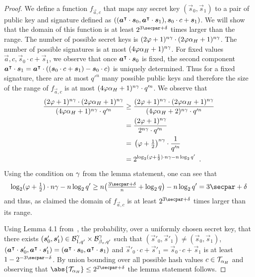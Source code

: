 \begin{proof}
  We define a function $f_{\vec{a}, c}$ that maps any secret key $(\vec{s}_0, \vec{s}_1)$ to a pair of public key and signature defined as $((\boldsymbol{a}^\intercal\cdot\boldsymbol{s}_0,\boldsymbol{a}^\intercal\cdot\boldsymbol{s}_1), \boldsymbol{s}_0\cdot c + \boldsymbol{s}_1)$.
  We will show that the domain of this function is at least $2^{3\secpar + \delta}$ times larger than the range.
  The number of possible secret keys is $(2\varphi+1)^{n\gamma} \cdot (2\varphi\alpha_H+1)^{n\gamma}$.
  The number of possible signatures is at most $(4\varphi\alpha_H + 1)^{n\gamma}$.
  For fixed values $\vec{a}, c, \vec{s}_0\cdot c + \vec{s}_1$, we observe that once $\boldsymbol{a}^\intercal\cdot\boldsymbol{s}_0$ is fixed, the second component $\boldsymbol{a}^\intercal\cdot\boldsymbol{s}_1 = \boldsymbol{a}^\intercal \cdot ((\boldsymbol{s}_0\cdot c + \boldsymbol{s}_1) - \boldsymbol{s}_0 \cdot c)$ is uniquely determined.
  Thus for a fixed signature, there are at most $q'^n$ many possible public keys and therefore the size of the range of $f_{\vec{a}, c}$ is at most $(4 \varphi\alpha_H + 1)^{n\gamma} \cdot q'^n$.
  We observe that
  \begin{align*}\frac{(2\varphi+1)^{n\gamma} \cdot (2\varphi\alpha_H+1)^{n\gamma}}{(4 \varphi\alpha_H + 1)^{n\gamma} \cdot q'^n}
   \geq{}& \frac{(2\varphi+1)^{n\gamma} \cdot (2\varphi\alpha_H+1)^{n\gamma}}{(4 \varphi\alpha_H + 2)^{n\gamma} \cdot q'^n}\\
   ={}& \frac{(2\varphi+1)^{n\gamma}}{2^{n\gamma} \cdot q'^n}\\
   ={}& \left(\varphi+\tfrac{1}{2}\right)^{n\gamma} \cdot \frac{1}{q'^n}\\
   ={}& 2^{\log_2(\varphi+\frac{1}{2})\cdot{n\gamma} - n \log_2 q'}\enspace.
  \end{align*}
  Using the condition on $\gamma$ from the lemma statement, one can see that
  \[
    \log_2(\varphi+\tfrac{1}{2})\cdot{n\otspkkeylen} - n \log_2 q'
    \geq n\bigl(\tfrac{3\secpar+\delta}{n}+\log_2q\bigr) - n \log_2 q' = 3\secpar+\delta
  \]
  and thus, as claimed the domain of $f_{\vec{a},c}$ is at least $2^{3\secpar + \delta}$ times larger than its range.
  
  Using Lemma 4.1 from~\cite{TCC:LyuMic08}, the probability, over a uniformly chosen secret key, that there exists $(\boldsymbol{s}'_0,\boldsymbol{s}'_1)\in \mathcal{B}_{1, q'}^\gamma \times \mathcal{B}_{\beta_s, q'}^\gamma$ such that $(\vec{s}'_0,\vec{s}'_1)\neq(\vec{s}_0,\vec{s}_1)$, $(\boldsymbol{a}^\intercal\cdot\boldsymbol{s}'_0,\boldsymbol{a}^\intercal\cdot\boldsymbol{s}'_1) = (\boldsymbol{a}^\intercal\cdot\boldsymbol{s}_0,\boldsymbol{a}^\intercal\cdot\boldsymbol{s}_1)$ and $\vec{s}'_0\cdot c + \vec{s}'_1 = \vec{s}_0\cdot c + \vec{s}_1$ is at least $1-2^{-3\secpar-\delta}$.
  By union bounding over all possible hash values $c \in \mathcal{T}_{\alpha_H}$ and observing that $\abs{\tern_{\alpha_H}} \leq 2^{2\secpar + \delta}$ the lemma statement follows.
  \end{proof}

